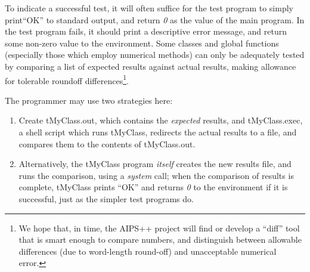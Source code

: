 To indicate a successful test, it will often suffice for the test
program to simply print``OK'' to standard output, and return {\it 0}
as the value of the main program.  In the test program fails, it
should print a descriptive error message, and return some non-zero
value to the environment.  Some classes and global functions
(especially those which employ numerical methods) can only be
adequately tested by comparing a list of expected results against
actual results, making allowance for tolerable roundoff
differences\footnote {We hope that, in time, the AIPS++ project will
find or develop a ``diff'' tool that is smart enough to compare
numbers, and distinguish between allowable differences (due to
word-length round-off) and unacceptable numerical error.}.

The programmer may use two strategies here:

\begin{enumerate}
   \item Create tMyClass.out, which contains the {\it expected} results, and
         tMyClass.exec, a shell script which runs tMyClass, redirects
         the actual results to a file, and compares them to the 
         contents of tMyClass.out.
   \item Alternatively, the tMyClass program {\em itself} creates the new 
         results file, and runs the comparison, using a {\it system} call;  
         when the comparison of results is complete, tMyClass prints ``OK'' 
         and returns {\it 0} to the environment if it is successful, just as
         the simpler test programs do.
\end{enumerate}
